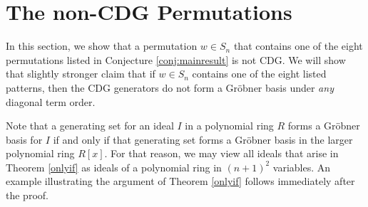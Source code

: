 \documentclass[ALCO,Unicode,published]{cedram}
\begin{document}
\section{The non-CDG Permutations}\label{sect:forward}

In this section, we show that a permutation $w \in S_n$ that contains one of the eight permutations listed in Conjecture \ref{conj:mainresult} is not CDG.   We will show that slightly stronger claim that if $w \in S_n$ contains one of the eight listed patterns, then the CDG generators do not form a Gr\"obner basis under \emph{any} diagonal term order.  

Note that a generating set for an ideal $I$ in a polynomial ring $R$ forms a Gr\"obner basis for $I$ if and only if that generating set forms a Gr\"obner basis in the larger polynomial ring $R[x]$.   For that reason, we may view all ideals that arise in Theorem \ref{onlyif} as ideals of a polynomial ring in $(n+1)^2$ variables.  An example illustrating the argument of Theorem \ref{onlyif} follows immediately after the proof.
\end{document}

